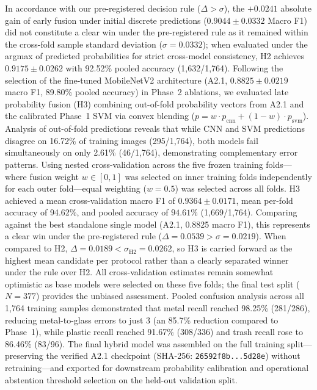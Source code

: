 In accordance with our pre-registered decision rule ($\Delta > \sigma$), the $+0.0241$ absolute gain of early fusion under initial discrete predictions ($0.9044\pm0.0332$ Macro F1) did not constitute a clear win under the pre-registered rule as it remained within the cross-fold sample standard deviation ($\sigma = 0.0332$); when evaluated under the argmax of predicted probabilities for strict cross-model consistency, H2 achieves $0.9175\pm0.0262$ with 92.52\% pooled accuracy (1,632/1,764). Following the selection of the fine-tuned MobileNetV2 architecture (A2.1, $0.8825\pm0.0219$ macro F1, 89.80\% pooled accuracy) in Phase~2 ablations, we evaluated late probability fusion (H3) combining out-of-fold probability vectors from A2.1 and the calibrated Phase~1 SVM via convex blending ($p = w \cdot p_{\mathrm{cnn}} + (1 - w) \cdot p_{\mathrm{svm}}$). Analysis of out-of-fold predictions reveals that while CNN and SVM predictions disagree on 16.72\% of training images (295/1,764), both models fail simultaneously on only 2.61\% (46/1,764), demonstrating complementary error patterns. Using nested cross-validation across the five frozen training folds—where fusion weight $w \in [0, 1]$ was selected on inner training folds independently for each outer fold—equal weighting ($w=0.5$) was selected across all folds. H3 achieved a mean cross-validation macro F1 of $\mathbf{0.9364\pm0.0171}$, mean per-fold accuracy of 94.62\%, and pooled accuracy of $\mathbf{94.61\%}$ (1,669/1,764). Comparing against the best standalone single model (A2.1, 0.8825 macro F1), this represents a clear win under the pre-registered rule ($\Delta = 0.0539 > \sigma = 0.0219$). When compared to H2, $\Delta = 0.0189 < \sigma_{\mathrm{H2}} = 0.0262$, so H3 is carried forward as the highest mean candidate per protocol rather than a clearly separated winner under the rule over H2. All cross-validation estimates remain somewhat optimistic as base models were selected on these five folds; the final test split ($N=377$) provides the unbiased assessment. Pooled confusion analysis across all 1,764 training samples demonstrated that metal recall reached 98.25\% (281/286), reducing metal-to-glass errors to just 3 (an 85.7\% reduction compared to Phase~1), while plastic recall reached 91.67\% (308/336) and trash recall rose to 86.46\% (83/96). The final hybrid model was assembled on the full training split—preserving the verified A2.1 checkpoint (SHA-256: \texttt{26592f8b...5d28e}) without retraining—and exported for downstream probability calibration and operational abstention threshold selection on the held-out validation split.
